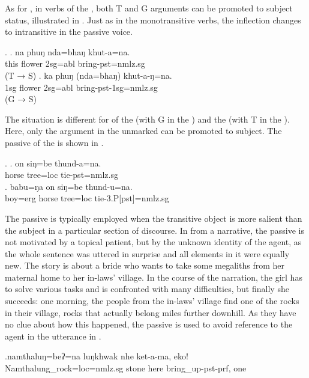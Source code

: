 \largerpage 
As for , in verbs of the , both T and G arguments can be promoted to subject  status, illustrated in \Next. Just as in the monotransitive verbs, the inflection changes to intransitive in the passive voice. 


\ex. \ag. na phuŋ nda=bhaŋ khut-a=na.\\
this  flower {\sc 2sg=abl} bring{\sc [3sg]-pst=nmlz.sg}\\
 (T → S)
\bg. ka phuŋ (nda=bhaŋ) khut-a-ŋ=na.\\ 
{\sc 1sg} flower {\sc 2sg=abl} bring{\sc -pst-1sg=nmlz.sg}\\
 (G → S)
 

The situation is different for  of the  (with G in the ) and the  (with T in the ). Here, only the argument in the  unmarked  can be promoted to subject. The passive of the  is shown in \Next.

\ex. \ag. on siŋ=be thund-a=na.\\
horse  tree{\sc =loc} tie{\sc [3sg]-pst=nmlz.sg}\\
\bg. babu=ŋa on siŋ=be thund-u=na.\\
boy{\sc =erg} horse  tree{\sc =loc}  tie{\sc -3.P[pst]=nmlz.sg}\\


The passive is typically employed when the transitive object is more salient than the subject in a particular section of discourse. In \Next from a narrative, the passive is not motivated by a topical patient, but by the unknown identity of the agent, as the whole sentence was uttered in surprise and all elements in it were equally new. The story is about a bride who wants to take some megaliths from her maternal home to her in-laws' village. In the course of the narration, the girl has to solve various tasks and is confronted with many difficulties, but finally she succeeds: one morning, the people from the in-laws' village find one of the rocks in their village, rocks that actually belong miles further downhill. As they have no clue about how this happened, the passive is used to avoid reference to the agent in the utterance in \Next. 

\exg.namthaluŋ=beʔ=na  luŋkhwak nhe  ket-a-ma, eko!\\
Namthalung\_rock{\sc =loc=nmlz.sg} stone here bring\_up{\sc [3sg]-pst-prf}, one\\



